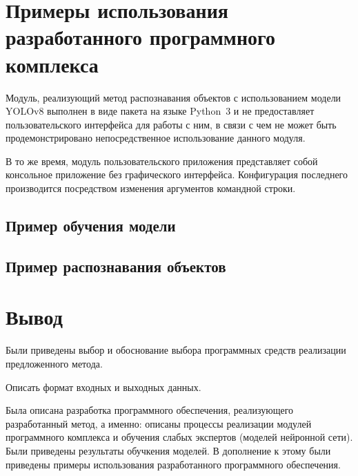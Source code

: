 \section{Примеры использования разработанного программного комплекса}

Модуль, реализующий метод распознавания объектов с использованием модели YOLOv8 выполнен в виде пакета на языке Python~3 и не предоставляет пользовательского интерфейса для работы с ним, в связи с чем не может быть продемонстрировано непосредственное использование данного модуля.

В то же время, модуль пользовательского приложения представляет собой консольное приложение без графического интерфейса. Конфигурация последнего производится посредством изменения аргументов командной строки.

\subsection{Пример обучения модели}



\subsection{Пример распознавания объектов}



\section{Вывод}

Были приведены выбор и обоснование выбора программных средств реализации предложенного метода.

Описать формат входных и выходных данных.

Была описана разработка программного обеспечения, реализующего разработанный метод, а именно: описаны процессы реализации модулей программного комплекса и обучения слабых экспертов (моделей нейронной сети). Были приведены результаты обучкения моделей. В дополнение к этому были приведены примеры использования разработанного программного обеспечения.
